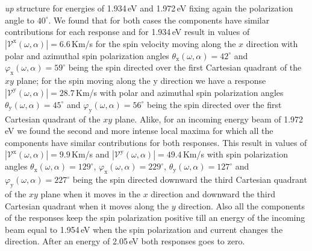 \documentclass[prb,11pt,tightenlines,twocolumn,aps]{revtex4-1}
\begin{document}
\emph{up} structure for energies of 1.934\,eV and 1.972\,eV
fixing again the polarization angle to $40^{\circ}$.
{\color{red} We found that for both cases the components have similar contributions for each
response and for 1.934\,eV result in values of
$|\mathcal{V}^{\mathrm{x}}(\omega,\alpha)| = 6.6$\,Km/s for the spin velocity
moving along the $x$ direction with polar and azimuthal spin polarization angles
$\theta_{\mathrm{x}}(\omega,\alpha)= 42^{\circ}$ and
$\varphi_{\mathrm{x}}(\omega,\alpha)=59^{\circ}$ being the spin directed over
the first Cartesian quadrant of the $xy$ plane;
% 
for the spin moving along the $\mathrm{y}$ direction we have a response
$|\mathcal{V}^{\mathrm{y}}(\omega,\alpha)|=28.7$\,Km/s with polar and azimuthal
spin polarization angles $\theta_{\mathrm{y}}(\omega,\alpha)=45^{\circ}$ and
$\varphi_{\mathrm{y}}(\omega,\alpha)=56^{\circ}$ being  the spin directed over
the first Cartesian quadrant of the $xy$ plane.
% 
Alike, for an incoming energy beam of 1.972\,eV we found the second and more
intense local maxima for which all the components have similar contributions for
both responses.
% 
This result in values of $|\mathcal{V}^{\mathrm{x}}(\omega,\alpha)| = 9.9$\,Km/s
and $|\mathcal{V}^{\mathrm{y}}(\omega,\alpha)| = 49.4$\,Km/s with spin
polarization angles $\theta_{\mathrm{x}}(\omega,\alpha) = 129^{\circ}$,
$\varphi_{\mathrm{x}}(\omega,\alpha)=229^{\circ}$,
$\theta_{\mathrm{y}}(\omega,\alpha) = 127^{\circ}$ and
$\varphi_{\mathrm{y}}(\omega,\alpha)=227^{\circ}$ being the spin directed
downward the third Cartesian quadrant of the $xy$ plane when it moves in the $x$
direction and downward the third Cartesian quadrant when it moves along the $y$
direction.}
% 
Also all the components of the responses keep the spin polarization positive
till an energy of the incoming beam equal to 1.954\,eV when the spin
polarization and current changes the direction. After an energy of 2.05\,eV both
responses goes to zero.

\end{document}
